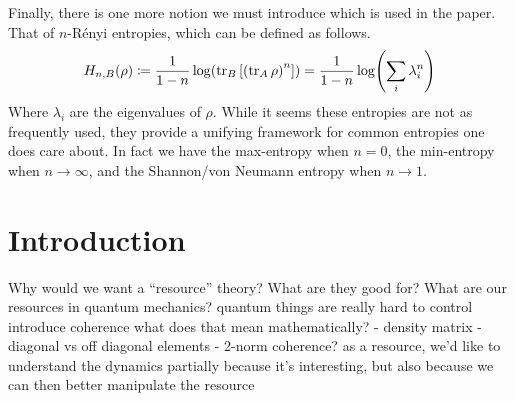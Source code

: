 \documentclass[11pt]{article}
\theoremstyle{definition}
\begin{document}
Finally, there is one more notion we must introduce which is used in the paper. That of $n$-R\'enyi entropies, which can be defined as follows.
\begin{equation*}
	H_{n, B}(\rho)\coloneqq \frac{1}{1-n}\log(\tr_B\qty[\qty(\tr_A \rho)^n]) = \frac{1}{1-n}\log(\sum_i\lambda_i^n)
\end{equation*}
Where $\lambda_i$ are the eigenvalues of $\rho$. While it seems these entropies are not as frequently used, they provide a unifying framework for common entropies one does care about. In fact we have the max-entropy when $n = 0$, the min-entropy when $n\to\infty$, and the Shannon/von Neumann entropy when $n \to 1$.


\section{Introduction}

Why would we want a ``resource'' theory?
What are they good for?
What are our resources in quantum mechanics?
quantum things are really hard to control
introduce coherence
what does that mean mathematically?
- density matrix
- diagonal vs off diagonal elements
- 2-norm coherence?
as a resource, we'd like to understand the dynamics partially because it's interesting, but also because we can then better manipulate the resource
\end{document}

